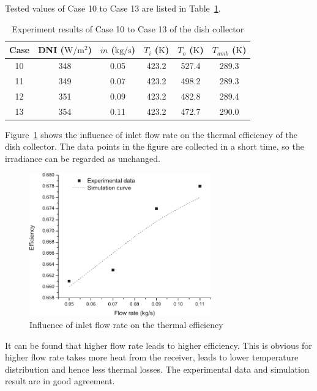 Tested values of Case 10 to Case 13 are listed in Table~\ref{tab:ResultOfDish2}.

\begin{table}[htbp]\footnotesize
	\caption{Experiment results of Case 10 to Case 13 of the dish collector}
	\begin{center}
	\begin{tabular}{cccccc}
		\toprule
		Case	& DNI ($\mathrm{W/m^2}$)	&	$\dot{m}$ ($\mathrm{kg/s}$)			&	$T_i$ ($\mathrm{K}$)	&	$T_o$ ($\mathrm{K}$)		&	$T_{amb}$ ($\mathrm{K}$)\\
		\midrule
		10	&	348	&	0.05	&	423.2	&	527.4	&	289.3\\
		11	&	349	&	0.07	&	423.2	&	498.2	&	289.3\\
		12	&	351	&	0.09	&	423.2	&	482.8	&	289.4	\\
		13	&	354	&	0.11	&	423.2	&	472.7	&	290.0\\
		\bottomrule
	\end{tabular}
	\end{center}
	\label{tab:ResultOfDish2}
\end{table}


Figure~\ref{fig:q_m-eta} shows the influence of inlet flow rate on the thermal efficiency of the dish collector. The data points in the figure are collected in a short time, so the irradiance can be regarded as unchanged.
\begin{figure}[!ht]
\centering
\includegraphics[width=0.7\textwidth]{fig/q_m-eta}
\caption{Influence of inlet flow rate on the thermal efficiency}
\label{fig:q_m-eta}
\end{figure}

It can be found that higher flow rate leads to higher efficiency. This is obvious for higher flow rate takes more heat from the receiver, leads to lower temperature distribution and hence less thermal losses. The experimental data and simulation result are in good agreement.

